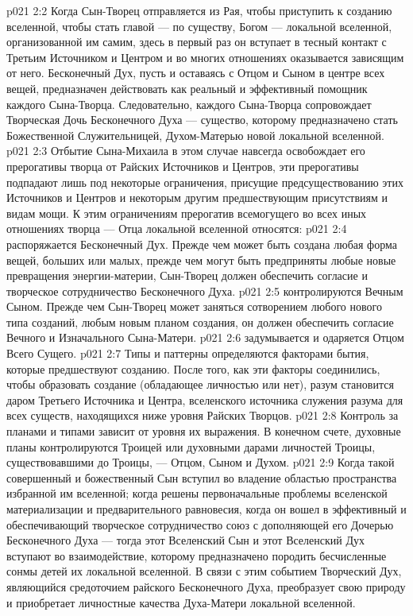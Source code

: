 \vs p021 2:2 \pc Когда Сын\hyp{}Творец отправляется из Рая, чтобы приступить к созданию вселенной, чтобы стать главой --- по существу, Богом --- локальной вселенной, организованной им самим, здесь в первый раз он вступает в тесный контакт с Третьим Источником и Центром и во многих отношениях оказывается зависящим от него. Бесконечный Дух, пусть и оставаясь с Отцом и Сыном в центре всех вещей, предназначен действовать как реальный и эффективный помощник каждого Сына\hyp{}Творца. Следовательно, каждого Сына\hyp{}Творца сопровождает Творческая Дочь Бесконечного Духа --- существо, которому предназначено стать Божественной Служительницей, Духом\hyp{}Матерью новой локальной вселенной.
\vs p021 2:3 Отбытие Сына\hyp{}Михаила в этом случае навсегда освобождает его прерогативы творца от Райских Источников и Центров, эти прерогативы подпадают лишь под некоторые ограничения, присущие предсуществованию этих Источников и Центров и некоторым другим предшествующим присутствиям и видам мощи. К этим ограничениям прерогатив всемогущего во всех иных отношениях творца --- Отца локальной вселенной относятся:
\vs p021 2:4 \bibnobreakspace {} распоряжается Бесконечный Дух. Прежде чем может быть создана любая форма вещей, больших или малых, прежде чем могут быть предприняты любые новые превращения энергии\hyp{}материи, Сын\hyp{}Творец должен обеспечить согласие и творческое сотрудничество Бесконечного Духа.
\vs p021 2:5 \bibnobreakspace {} контролируются Вечным Сыном. Прежде чем Сын\hyp{}Творец может заняться сотворением любого нового типа созданий, любым новым планом создания, он должен обеспечить согласие Вечного и Изначального Сына\hyp{}Матери.
\vs p021 2:6 \bibnobreakspace {} задумывается и одаряется Отцом Всего Сущего.
\vs p021 2:7 \pc Типы и паттерны  определяются факторами бытия, которые предшествуют созданию. После того, как эти факторы соединились, чтобы образовать создание (обладающее личностью или нет), разум становится даром Третьего Источника и Центра, вселенского источника служения разума для всех существ, находящихся ниже уровня Райских Творцов.
\vs p021 2:8 \pc Контроль за планами и типами  зависит от уровня их выражения. В конечном счете, духовные планы контролируются Троицей или духовными дарами личностей Троицы, существовавшими до Троицы, --- Отцом, Сыном и Духом.
\vs p021 2:9 \pc Когда такой совершенный и божественный Сын вступил во владение областью пространства избранной им вселенной; когда решены первоначальные проблемы вселенской материализации и предварительного равновесия, когда он вошел в эффективный и обеспечивающий творческое сотрудничество союз с дополняющей его Дочерью Бесконечного Духа --- тогда этот Вселенский Сын и этот Вселенский Дух вступают во взаимодействие, которому предназначено породить бесчисленные сонмы детей их локальной вселенной. В связи с этим событием Творческий Дух, являющийся средоточием райского Бесконечного Духа, преобразует свою природу и приобретает личностные качества Духа\hyp{}Матери локальной вселенной.
